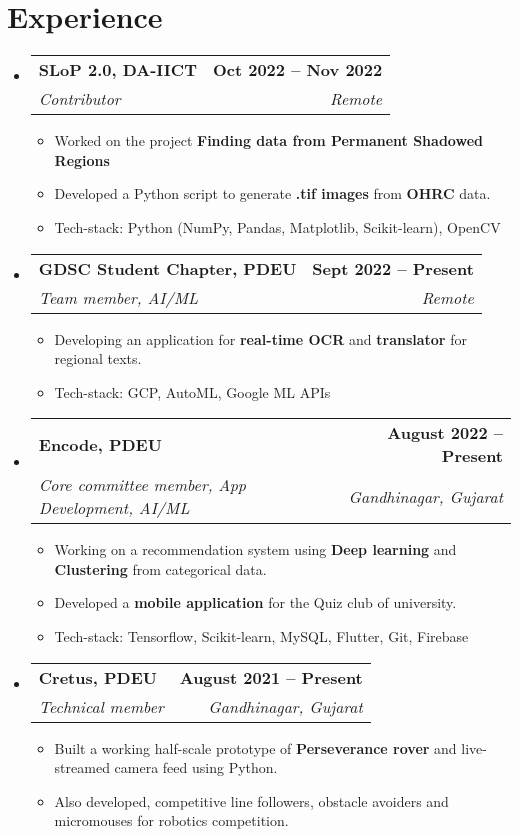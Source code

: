 \documentclass[letterpaper,11pt]{article}
\makeatletter
\newcommand{\resumeItem}[1]{
  \item\small{
    {#1 \vspace{-2pt}}
  }
}
\newcommand{\resumeSubheading}[4]{
  \vspace{-2pt}\item
    \begin{tabular*}{1.0\textwidth}[t]{l@{\extracolsep{\fill}}r}
      \textbf{#1} & \textbf{\small #2} \\
      \textit{\small#3} & \textit{\small #4} \\
    \end{tabular*}\vspace{-7pt}
}
\newcommand{\resumeSubHeadingListStart}{\begin{itemize}[leftmargin=0.0in, label={}]}
\newcommand{\resumeSubHeadingListEnd}{\end{itemize}}
\newcommand{\resumeItemListStart}{\begin{itemize}}
\newcommand{\resumeItemListEnd}{\end{itemize}\vspace{-5pt}}
\makeatother
\begin{document}
\section{Experience}
    \vspace{1pt}
  \resumeSubHeadingListStart
    \resumeSubheading
      {SLoP 2.0, DA-IICT}{Oct 2022 -- Nov 2022}
      {Contributor}{Remote}
      \resumeItemListStart
        \resumeItem{Worked on the project \textbf{Finding data from Permanent Shadowed Regions}}
        \resumeItem{Developed a Python script to generate \textbf{.tif images} from \textbf{OHRC} data.}
        \resumeItem{Tech-stack: Python (NumPy, Pandas, Matplotlib, Scikit-learn), OpenCV}
      \resumeItemListEnd

      \resumeSubheading
      {GDSC Student Chapter, PDEU}{Sept 2022 -- Present}
      {Team member, AI/ML}{Remote}
      \resumeItemListStart
        \resumeItem{Developing an application for \textbf{real-time OCR} and \textbf{translator} for regional texts.}
        \resumeItem{Tech-stack: GCP, AutoML, Google ML APIs}
      \resumeItemListEnd

    \resumeSubheading
      {Encode, PDEU}{August 2022 -- Present}
      {Core committee member, App Development, AI/ML}{Gandhinagar, Gujarat}
      \resumeItemListStart
        \resumeItem{Working on a recommendation system using \textbf{Deep learning} and \textbf{Clustering} from categorical data.}
        \resumeItem{Developed a \textbf{mobile application} for the Quiz club of university.}
        \resumeItem{Tech-stack: Tensorflow, Scikit-learn, MySQL, Flutter, Git, Firebase}
    \resumeItemListEnd
    
    \resumeSubheading
      {Cretus, PDEU}{August 2021 -- Present}
      {Technical member}{Gandhinagar, Gujarat}
      \resumeItemListStart
        \resumeItem{Built a working half-scale prototype of \textbf{Perseverance rover} and live-streamed camera feed using Python.}
        \resumeItem{Also developed, competitive line followers, obstacle avoiders and micromouses for robotics competition.}
    \resumeItemListEnd
    
  \resumeSubHeadingListEnd
\vspace{4pt}
\end{document}
